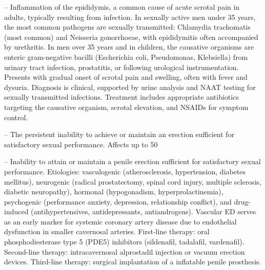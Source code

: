 -- Inflammation of the epididymis, a common cause of acute scrotal pain in adults, typically resulting from infection. In sexually active men under 35 years, the most common pathogens are sexually transmitted: Chlamydia trachomatis (most common) and Neisseria gonorrhoeae, with epididymitis often accompanied by urethritis. In men over 35 years and in children, the causative organisms are enteric gram-negative bacilli (Escherichia coli, Pseudomonas, Klebsiella) from urinary tract infection, prostatitis, or following urological instrumentation. Presents with gradual onset of scrotal pain and swelling, often with fever and dysuria. Diagnosis is clinical, supported by urine analysis and NAAT testing for sexually transmitted infections. Treatment includes appropriate antibiotics targeting the causative organism, scrotal elevation, and NSAIDs for symptom control.

-- The persistent inability to achieve or maintain an erection sufficient for satisfactory sexual performance. Affects up to 50%

-- Inability to attain or maintain a penile erection sufficient for satisfactory sexual performance. Etiologies: vasculogenic (atherosclerosis, hypertension, diabetes mellitus), neurogenic (radical prostatectomy, spinal cord injury, multiple sclerosis, diabetic neuropathy), hormonal (hypogonadism, hyperprolactinemia), psychogenic (performance anxiety, depression, relationship conflict), and drug-induced (antihypertensives, antidepressants, antiandrogens). Vascular ED serves as an early marker for systemic coronary artery disease due to endothelial dysfunction in smaller cavernosal arteries. First-line therapy: oral phosphodiesterase type 5 (PDE5) inhibitors (sildenafil, tadalafil, vardenafil). Second-line therapy: intracavernosal alprostadil injection or vacuum erection devices. Third-line therapy: surgical implantation of a inflatable penile prosthesis.

